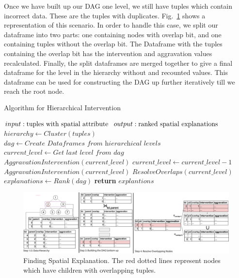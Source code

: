 Once we have built up our DAG one level, we still have tuples which contain incorrect data. These are the tuples with duplicates. Fig.~\ref{fig:steps} shows a representation of this scenario. In order to handle this case, we split our dataframe into two parts: one containing nodes with overlap bit, and one containing tuples without the overlap bit. The Dataframe with the tuples containing the overlap bit has the intervention and aggravation values recalculated. Finally, the split dataframes are merged together to give a final dataframe for the level in the hierarchy without and recounted values. This dataframe can be used for constructing the DAG up further iteratively till we reach the root node.

\begin{algorithm}
\caption{Algorithm for Hierarchical Intervention}\label{alg:hieint}
\begin{algorithmic}[1]
	\State $input: \textnormal{tuples with spatial attribute}$
    \State $output: \textnormal{ranked spatial explanations}$
    \State $hierarchy \gets Cluster(tuples)$
    \State $dag \gets \textit{Create Dataframes from hierarchical levels}$
    \State $current\_level \gets \textit{Get last level from }dag$
    \State $AggravationIntervention(current\_level)$
    \State $current\_level \gets current\_level - 1$
    	\State $AggravationIntervention(current\_level)$
        \State $ResolveOverlaps(current\_level)$
    \EndWhile
    \State $explanations \gets Rank(dag)$
    \State \textbf{return} $explantions$
\EndProcedure
\end{algorithmic}
\end{algorithm}




\begin{figure}[t]
\centerline{\includegraphics[width=\textwidth]{images/steps}}
\caption{Finding Spatial Explanation. The red dotted lines represent nodes which have children with overlapping tuples.}
  \label{fig:steps}
\end{figure}


